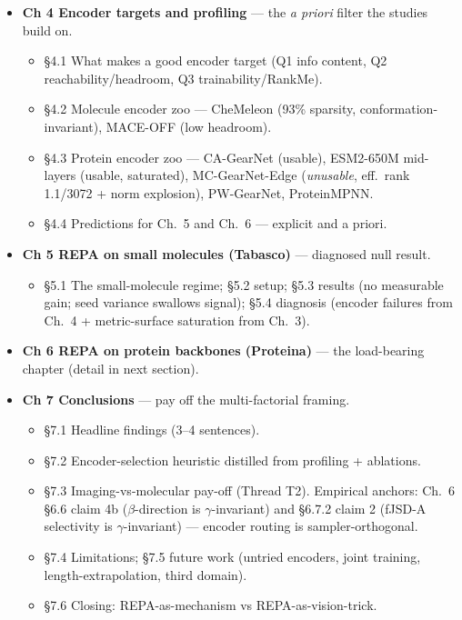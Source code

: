 \documentclass[11pt,a4paper]{article}
\begin{document}
\begin{itemize}[leftmargin=*,itemsep=2pt]
\item \textbf{Ch 4 Encoder targets and profiling} --- the \emph{a priori}
filter the studies build on.
  \begin{itemize}[leftmargin=*,itemsep=0pt]
  \item \S4.1 What makes a good encoder target (Q1 info content, Q2
  reachability/headroom, Q3 trainability/RankMe).
  \item \S4.2 Molecule encoder zoo --- CheMeleon (93\% sparsity,
  conformation-invariant), MACE-OFF (low headroom).
  \item \S4.3 Protein encoder zoo --- CA-GearNet (usable), ESM2-650M
  mid-layers (usable, saturated), MC-GearNet-Edge (\emph{unusable},
  eff.\ rank 1.1/3072 + norm explosion), PW-GearNet, ProteinMPNN.
  \item \S4.4 Predictions for Ch.~5 and Ch.~6 --- explicit and a priori.
  \end{itemize}

\item \textbf{Ch 5 REPA on small molecules (Tabasco)} --- diagnosed null
result.
  \begin{itemize}[leftmargin=*,itemsep=0pt]
  \item \S5.1 The small-molecule regime; \S5.2 setup; \S5.3 results (no
  measurable gain; seed variance swallows signal); \S5.4 diagnosis
  (encoder failures from Ch.~4 + metric-surface saturation from Ch.~3).
  \end{itemize}

\item \textbf{Ch 6 REPA on protein backbones (Proteina)} --- the
load-bearing chapter (detail in next section).

\item \textbf{Ch 7 Conclusions} --- pay off the multi-factorial framing.
  \begin{itemize}[leftmargin=*,itemsep=0pt]
  \item \S7.1 Headline findings (3--4 sentences).
  \item \S7.2 Encoder-selection heuristic distilled from profiling +
  ablations.
  \item \S7.3 Imaging-vs-molecular pay-off (Thread T2). Empirical anchors:
  Ch.~6 \S6.6 claim 4b ($\beta$-direction is $\gamma$-invariant) and
  \S6.7.2 claim 2 (fJSD-A selectivity is $\gamma$-invariant) ---
  encoder routing is sampler-orthogonal.
  \item \S7.4 Limitations; \S7.5 future work (untried encoders, joint
  training, length-extrapolation, third domain).
  \item \S7.6 Closing: REPA-as-mechanism vs REPA-as-vision-trick.
  \end{itemize}
\end{itemize}
\end{document}
